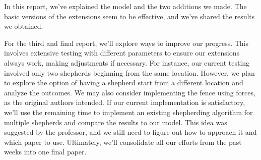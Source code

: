 

In this report, we've explained the model and the two additions we made. The basic versions of the extensions seem to be effective, and we've shared the results we obtained.

For the third and final report, we'll explore ways to improve our progress. This involves extensive testing with different parameters to ensure our extensions always work, making adjustments if necessary. For instance, our current testing involved only two shepherds beginning from the same location. However, we plan to explore the option of having a shepherd start from a different location and analyze the outcomes. We may also consider implementing the fence using forces, as the original authors intended. If our current implementation is satisfactory, we'll use the remaining time to implement an existing shepherding algorithm for multiple shepherds and compare the results to our model. This idea was suggested by the professor, and we still need to figure out how to approach it and which paper to use. Ultimately, we'll consolidate all our efforts from the past weeks into one final paper.
